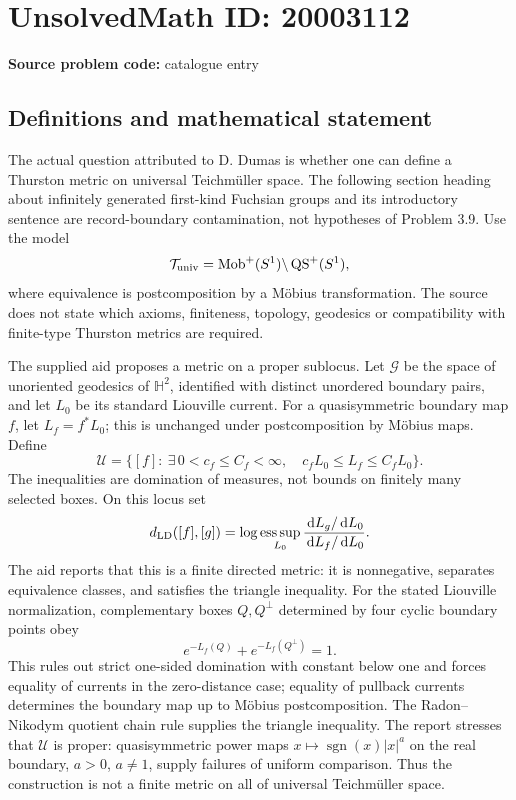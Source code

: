 \documentclass[11pt]{article}
\newcommand{\dd}{\,\mathrm{d}}
\begin{document}
\section*{UnsolvedMath ID: 20003112}
\textbf{Source problem code:} catalogue entry
\subsection{Definitions and mathematical statement}
The actual question attributed to D. Dumas is whether one can define a Thurston metric on universal Teichm\"uller space. The following section heading about infinitely generated first-kind Fuchsian groups and its introductory sentence are record-boundary contamination, not hypotheses of Problem 3.9. Use the model
\[
\mathcal T_{\rm univ}=\operatorname{Mob}^+(S^1)\backslash\operatorname{QS}^+(S^1),
\]
where equivalence is postcomposition by a M\"obius transformation. The source does not state which axioms, finiteness, topology, geodesics or compatibility with finite-type Thurston metrics are required.

The supplied aid proposes a metric on a proper sublocus. Let \(\mathcal G\) be the space of unoriented geodesics of \(\mathbb H^2\), identified with distinct unordered boundary pairs, and let \(L_0\) be its standard Liouville current. For a quasisymmetric boundary map \(f\), let \(L_f=f^*L_0\); this is unchanged under postcomposition by M\"obius maps. Define
\[
\mathcal U=\{[f]:\ \exists\,0<c_f\le C_f<\infty,\quad c_fL_0\le L_f\le C_fL_0\}.
\]
The inequalities are domination of measures, not bounds on finitely many selected boxes. On this locus set
\[
d_{\rm LD}([f],[g])=\log\operatorname*{ess\,sup}_{L_0}
\frac{\dd L_g/\dd L_0}{\dd L_f/\dd L_0}.
\]
The aid reports that this is a finite directed metric: it is nonnegative, separates equivalence classes, and satisfies the triangle inequality. For the stated Liouville normalization, complementary boxes \(Q,Q^\perp\) determined by four cyclic boundary points obey
\[
e^{-L_f(Q)}+e^{-L_f(Q^\perp)}=1.
\]
This rules out strict one-sided domination with constant below one and forces equality of currents in the zero-distance case; equality of pullback currents determines the boundary map up to M\"obius postcomposition. The Radon--Nikodym quotient chain rule supplies the triangle inequality. The report stresses that \(\mathcal U\) is proper: quasisymmetric power maps \(x\mapsto\operatorname{sgn}(x)|x|^a\) on the real boundary, \(a>0\), \(a\ne1\), supply failures of uniform comparison. Thus the construction is not a finite metric on all of universal Teichm\"uller space.
\end{document}
